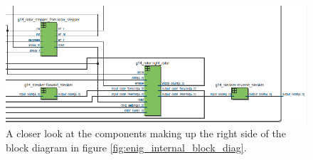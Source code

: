 \documentclass{article}
\begin{document}
\begin{figure}[ht!]
    \centering
    \includegraphics[scale=0.5]{enig_internal_right.PNG}
    \caption{A closer look at the components making up the right side of the block diagram in figure \ref{fig:enig_internal_block_diag}.}
    \label{fig:enig_internal_bl_diag_right}
\end{figure}
\end{document}
